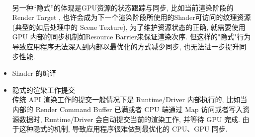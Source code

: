 \documentclass[UTF8]{ctexart}
\begin{document}
\begin{itemize}
  \\另一种“隐式”的体现是GPU资源的状态跟踪与同步, 比如当前渲染阶段的 Render Target , 也许会成为下一个渲染阶段所使用的Shader可访问的纹理资源(典型的如后处理中的 Scene Texture), 为了维护资源状态的正确, 就需要使用 GPU 内部的同步机制如Resource Barrier来保证渲染次序. 但这样的"隐式"行为导致应用程序无法深入到内部以最优化的方式减少同步, 也无法进一步提升同步性能.
\item Shader 的编译
\item 隐式的渲染工作提交
  \\传统 API 渲染工作的提交一般情况下是 Runtime/Driver 内部执行的, 比如当内部的 Render Command Buffer 已满或者 CPU 端通过 Map 访问或者写入资源数据时, Runtime/Driver 会自动提交当前的渲染工作, 并等待 GPU 完成. 由于这种隐式的机制, 导致应用程序很难做到最优化的 CPU、GPU 同步.
\end{itemize}
\end{document}
